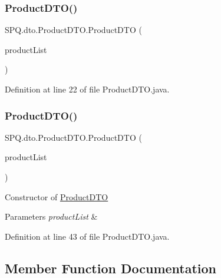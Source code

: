 \subsubsection{\texorpdfstring{Product\+D\+T\+O()}{ProductDTO()}\hspace{0.1cm}{\footnotesize\ttfamily [1/2]}}
{\footnotesize\ttfamily S\+P\+Q.\+dto.\+Product\+D\+T\+O.\+Product\+D\+TO (\begin{DoxyParamCaption}\item[{Array\+List$<$ \mbox{\hyperlink{class_s_p_q_1_1data_1_1_product}{Product}} $>$}]{product\+List }\end{DoxyParamCaption})}



Definition at line 22 of file Product\+D\+T\+O.\+java.

\mbox{\label{class_s_p_q_1_1dto_1_1_product_d_t_o_a206290d64e728a8838485f958bee2c29}} 
\subsubsection{\texorpdfstring{Product\+D\+T\+O()}{ProductDTO()}\hspace{0.1cm}{\footnotesize\ttfamily [2/2]}}
{\footnotesize\ttfamily S\+P\+Q.\+dto.\+Product\+D\+T\+O.\+Product\+D\+TO (\begin{DoxyParamCaption}\item[{Array\+List$<$ \mbox{\hyperlink{class_s_p_q_1_1data_1_1_product}{Product}} $>$}]{product\+List }\end{DoxyParamCaption})}

Constructor of \mbox{\hyperlink{class_s_p_q_1_1dto_1_1_product_d_t_o}{Product\+D\+TO}} 
\begin{DoxyParams}{Parameters}
{\em product\+List} & \\
\hline
\end{DoxyParams}


Definition at line 43 of file Product\+D\+T\+O.\+java.



\subsection{Member Function Documentation}
\mbox{\label{class_s_p_q_1_1dto_1_1_product_d_t_o_a4b7df5983f4342285d495a335fb9019f}} 
